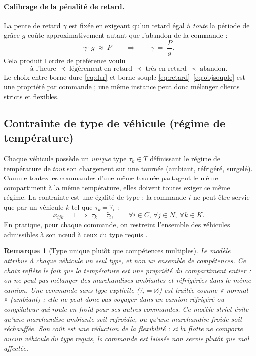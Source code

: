 \documentclass[12pt,a4paper]{report}
\newtheorem{remarque}{Remarque}
\begin{document}
\paragraph{Calibrage de la pénalité de retard.}
La pente de retard $\gamma$ est fixée en exigeant qu'un retard égal à
\emph{toute} la période de grâce $g$ coûte approximativement autant que
l'abandon de la commande :
%
\begin{equation}
  \gamma \cdot g \;\approx\; P
  \qquad\Longrightarrow\qquad
  \gamma \;=\; \frac{P}{g}.
  \label{eq:gamma}
\end{equation}
%
Cela produit l'ordre de préférence voulu
%
\[
  \text{à l'heure} \;\prec\; \text{légèrement en retard}
  \;\prec\; \text{très en retard} \;\prec\; \text{abandon}.
\]
%
Le choix entre borne dure \eqref{eq:dur} et borne souple
\eqref{eq:retard}--\eqref{eq:objsouple} est une propriété par commande ; une
même instance peut donc mélanger clients stricts et flexibles.

\subsection{Contrainte de type de véhicule (régime de température)}
\label{sec:type}

Chaque véhicule possède un \emph{unique} type $\tau_k \in T$ définissant le
régime de température de \emph{tout} son chargement sur une tournée (ambiant,
réfrigéré, surgelé). Comme toutes les commandes d'une même tournée partagent
le même compartiment à la même température, elles doivent toutes exiger ce
même régime. La contrainte est une égalité de type : la commande $i$ ne peut
être servie que par un véhicule $k$ tel que $\tau_k = \hat{\tau}_i$ :
%
\begin{equation}
  x_{ijk} = 1 \;\Longrightarrow\; \tau_k = \hat{\tau}_i,
  \qquad \forall i \in C,\ \forall j \in N,\ \forall k \in K.
  \label{eq:type}
\end{equation}
%
En pratique, pour chaque commande, on restreint l'ensemble des véhicules
admissibles à son nœud à ceux du type requis \cite{ortools}.

\begin{remarque}[Type unique plutôt que compétences multiples]
\label{rem:type}
Le modèle attribue à chaque véhicule un \emph{seul} type, et non un ensemble
de compétences. Ce choix reflète le fait que la température est une propriété
du \emph{compartiment entier} : on ne peut pas mélanger des marchandises
ambiantes et réfrigérées dans le même camion. Une commande sans type
explicite ($\hat{\tau}_i = \varnothing$) est traitée comme « normal »
(ambiant) ; elle ne peut donc pas voyager dans un camion réfrigéré ou
congélateur qui roule en froid pour ses autres commandes. Ce modèle
\emph{strict} évite qu'une marchandise ambiante soit refroidie, ou qu'une
marchandise froide soit réchauffée. Son coût est une réduction de la
flexibilité : si la flotte ne comporte aucun véhicule du type requis, la
commande est laissée non servie plutôt que mal affectée.
\end{remarque}
\end{document}
